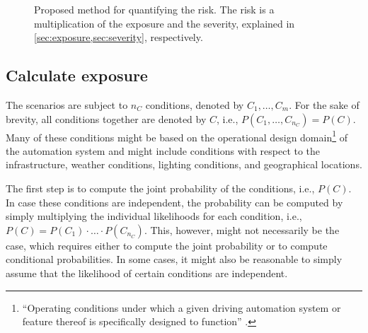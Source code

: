 \begin{figure}
	\centering
	
	\caption{Proposed method for quantifying the risk. The risk is a multiplication of the exposure and the severity, explained in \cref{sec:exposure,sec:severity}, respectively.}
	\label{fig:method}
\end{figure}



\subsection{Calculate exposure}
\label{sec:exposure}

The scenarios are subject to $n_C$ conditions, denoted by $C_1, \ldots, C_m$. For the sake of brevity, all conditions together are denoted by $C$, i.e., $P(C_1, \ldots, C_{n_C})=P(C)$. Many of these conditions might be based on the operational design domain\footnote{``Operating conditions under which a given driving automation system or feature thereof is specifically designed to function'' \cite{sea2018j3016}.} of the automation system and might include conditions with respect to the infrastructure, weather conditions, lighting conditions, and geographical locations. 

The first step is to compute the joint probability of the conditions, i.e., $P(C)$. In case these conditions are independent, the probability can be computed by simply multiplying the individual likelihoods for each condition, i.e., $P(C)=P(C_1)\cdot\ldots\cdot P(C_{n_C})$. This, however, might not necessarily be the case, which requires either to compute the joint probability or to compute conditional probabilities. In some cases, it might also be reasonable to simply assume that the likelihood of certain conditions are independent.

